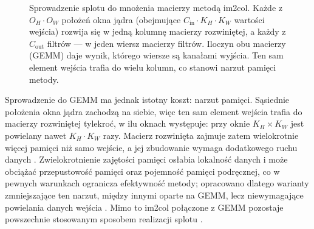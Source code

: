 \documentclass[a4paper,12pt]{book} %
\begin{document}
\begin{figure}[t!]
\centering
{}
\caption{Sprowadzenie splotu do mnożenia macierzy metodą im2col. Każde z $O_H \cdot O_W$ położeń okna jądra (obejmujące $C_{\mathrm{in}} \cdot K_H \cdot K_W$ wartości wejścia) rozwija się w jedną kolumnę macierzy rozwiniętej, a każdy z $C_{\mathrm{out}}$ filtrów --- w jeden wiersz macierzy filtrów. Iloczyn obu macierzy (GEMM) daje wynik, którego wiersze są kanałami wyjścia. Ten sam element wejścia trafia do wielu kolumn, co stanowi narzut pamięci metody.}
\label{rys:im2col}
\end{figure}

Sprowadzenie do GEMM ma jednak istotny koszt: narzut pamięci. Sąsiednie położenia okna jądra zachodzą na siebie, więc ten sam element wejścia trafia do macierzy rozwiniętej tylekroć, w ilu oknach występuje: przy oknie $K_H \times K_W$ jest powielany nawet $K_H \cdot K_W$ razy. Macierz rozwinięta zajmuje zatem wielokrotnie więcej pamięci niż samo wejście, a jej zbudowanie wymaga dodatkowego ruchu danych \cite{chellapilla2006highperf,vasudevan2017mcmk}. Zwielokrotnienie zajętości pamięci osłabia lokalność danych i może obciążać przepustowość pamięci oraz pojemność pamięci podręcznej, co w pewnych warunkach ogranicza efektywność metody; opracowano dlatego warianty zmniejszające ten narzut, między innymi oparte na GEMM, lecz niewymagające powielania danych wejścia \cite{vasudevan2017mcmk}. Mimo to im2col połączone z GEMM pozostaje powszechnie stosowanym sposobem realizacji splotu \cite{vasudevan2017mcmk}.
\end{document}
